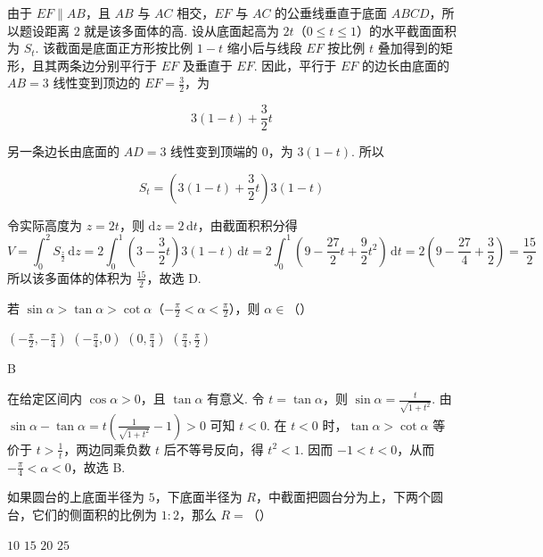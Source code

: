 \documentclass[UTF8,a4paper,oneside,11pt]{ctexbook}
\begin{document}
\begin{solution}
由于 \(EF\parallel AB\)，且 \(AB\) 与 \(AC\) 相交，\(EF\) 与 \(AC\) 的公垂线垂直于底面 \(ABCD\)，所以题设距离 \(2\) 就是该多面体的高. 设从底面起高为 \(2t\)（\(0\leqslant t\leqslant1\)）的水平截面面积为 \(S_t\). 该截面是底面正方形按比例 \(1-t\) 缩小后与线段 \(EF\) 按比例 \(t\) 叠加得到的矩形，且其两条边分别平行于 \(EF\) 及垂直于 \(EF\). 因此，平行于 \(EF\) 的边长由底面的 \(AB=3\) 线性变到顶边的 \(EF=\frac{3}{2}\)，为

\[
3(1-t)+\frac{3}{2}t
\]

另一条边长由底面的 \(AD=3\) 线性变到顶端的 \(0\)，为 \(3(1-t)\). 所以

\[
S_t=\left(3(1-t)+\frac{3}{2}t\right)3(1-t)
\]

令实际高度为 \(z=2t\)，则 \(\mathrm dz=2\,\mathrm dt\)，由截面积积分得
\[
V=\int_0^2 S_{\frac{z}{2}}\,\mathrm dz
 =2\int_0^1\left(3-\frac{3}{2}t\right)3(1-t)\,\mathrm dt
 =2\int_0^1\left(9-\frac{27}{2}t+\frac{9}{2}t^2\right)\,\mathrm dt
 =2\left(9-\frac{27}{4}+\frac{3}{2}\right)
 =\frac{15}{2}
\]
所以该多面体的体积为 \(\frac{15}{2}\)，故选 D.
\end{solution}

\begin{problem}
若 \(\sin \alpha>\tan \alpha>\cot \alpha\)（\(-\frac{\pi}{2}<\alpha<\frac{\pi}{2}\)），则 \(\alpha\in\)（\quad）

\choices
    {\(\left(-\frac{\pi}{2}, -\frac{\pi}{4}\right)\)}
    {\(\left(-\frac{\pi}{4}, 0\right)\)}
    {\(\left(0, \frac{\pi}{4}\right)\)}
    {\(\left(\frac{\pi}{4}, \frac{\pi}{2}\right)\)}
\end{problem}

\begin{answer}
B
\end{answer}

\begin{solution}
在给定区间内 \(\cos\alpha>0\)，且 \(\tan\alpha\) 有意义. 令 \(t=\tan\alpha\)，则
\(\sin\alpha=\frac{t}{\sqrt{1+t^2}}\).
由
\(\sin\alpha-\tan\alpha=t\left(\frac{1}{\sqrt{1+t^2}}-1\right)>0\)
可知 \(t<0\). 在 \(t<0\) 时，\(\tan\alpha>\cot\alpha\) 等价于 \(t>\frac{1}{t}\)，两边同乘负数 \(t\) 后不等号反向，得 \(t^2<1\). 因而
\(-1<t<0\)，从而 \(-\frac{\pi}{4}<\alpha<0\)，故选 B.
\end{solution}

\begin{problem}
如果圆台的上底面半径为 \(5\)，下底面半径为 \(R\)，中截面把圆台分为上，下两个圆台，它们的侧面积的比例为 \(1:2\)，那么 \(R=\)（\quad）

\choices
    {\(10\)}
    {\(15\)}
    {\(20\)}
    {\(25\)}
\end{problem}
\end{document}
